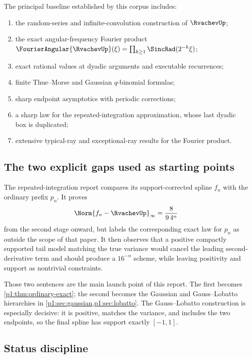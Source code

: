 \documentclass[11pt]{article}
\numberwithin{equation}{section}
\theoremstyle{definition}
\theoremstyle{remark}
\begin{document}
The principal baseline established by this corpus includes:
\begin{enumerate}
\item the random-series and infinite-convolution construction of $\RvachevUp$;
\item the exact angular-frequency Fourier product \(\FourierAngular{\RvachevUp}(\xi)=\prod_{k\ge1}\SincRad(2^{-k}\xi)\);
\item exact rational values at dyadic arguments and executable recurrences;
\item finite Thue--Morse and Gaussian $q$-binomial formulas;
\item sharp endpoint asymptotics with periodic corrections;
\item a sharp law for the repeated-integration approximation, whose last dyadic box is duplicated;
\item extensive typical-ray and exceptional-ray results for the Fourier product.
\end{enumerate}

\subsection{The two explicit gaps used as starting points}

The repeated-integration report compares its support-corrected spline $f_n$ with the ordinary prefix $p_n$.  It proves
\[
 \Norm{f_n-\RvachevUp}_\infty=\frac{8}{9\,4^n}
\]
from the second stage onward, but labels the corresponding exact law for $p_n$ as outside the scope of that paper.  It then observes that a positive compactly supported tail model matching the true variance would cancel the leading second-derivative term and should produce a $16^{-n}$ scheme, while leaving positivity and support as nontrivial constraints.

Those two sentences are the main launch point of this report.  The first becomes \cref{p1:thm:ordinary-exact}; the second becomes the Gaussian and Gauss--Lobatto hierarchies in \cref{p1:sec:gaussian,p1:sec:lobatto}.  The Gauss--Lobatto construction is especially decisive: it is positive, matches the variance, and includes the two endpoints, so the final spline has support exactly $[-1,1]$.

\subsection{Status discipline}
\end{document}
